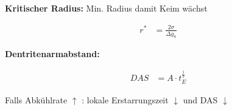 \begin{minipage}{0.6\linewidth}
    \textbf{Kritischer Radius:} Min. Radius damit Keim wächst
\end{minipage}
\begin{minipage}{0.4\linewidth}
    \[
        \boxed{       
            \begin{aligned}
                r^{*} &= \frac{2\sigma}{\Delta g_u}
            \end{aligned}
        }
    \]
\end{minipage}

\vspace{1mm}

\begin{minipage}{0.6\linewidth}
    \textbf{Dentritenarmabstand:}
\end{minipage}
\begin{minipage}{0.4\linewidth}
    \[
        \boxed{       
            \begin{aligned}
                DAS &= A \cdot t^{\frac{1}{3}}_{E}
            \end{aligned}
        }
    \]
\end{minipage}
\vspace{1mm}

Falls Abkühlrate $\uparrow $ :  lokale Erstarrungszeit $\downarrow $ und DAS $\downarrow $\\



